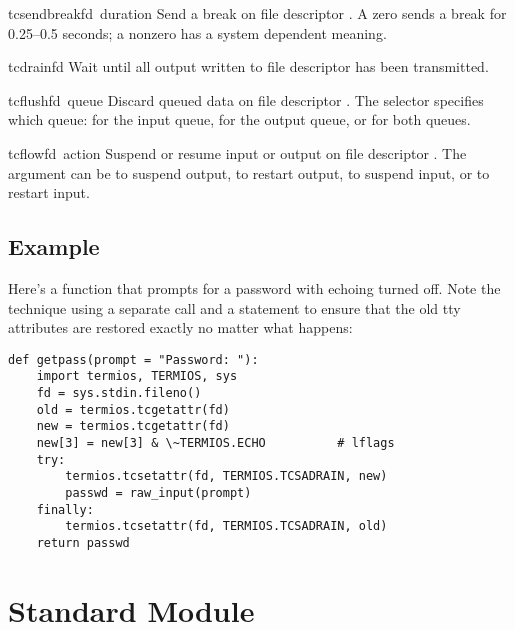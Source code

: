 \begin{funcdesc}{tcsendbreak}{fd\, duration}
Send a break on file descriptor .  A zero  sends
a break for 0.25--0.5 seconds; a nonzero  has a system
dependent meaning.
\end{funcdesc}

\begin{funcdesc}{tcdrain}{fd}
Wait until all output written to file descriptor  has been
transmitted.
\end{funcdesc}

\begin{funcdesc}{tcflush}{fd\, queue}
Discard queued data on file descriptor .  The 
selector specifies which queue:  for the input
queue,  for the output queue, or
 for both queues.
\end{funcdesc}

\begin{funcdesc}{tcflow}{fd\, action}
Suspend or resume input or output on file descriptor .  The
 argument can be  to suspend output,
 to restart output,  to
suspend input, or  to restart input.
\end{funcdesc}

\subsection{Example}

Here's a function that prompts for a password with echoing turned off.
Note the technique using a separate  call
and a  statement to ensure that the old tty
attributes are restored exactly no matter what happens:

\begin{verbatim}
def getpass(prompt = "Password: "):
    import termios, TERMIOS, sys
    fd = sys.stdin.fileno()
    old = termios.tcgetattr(fd)
    new = termios.tcgetattr(fd)
    new[3] = new[3] & \~TERMIOS.ECHO          # lflags
    try:
        termios.tcsetattr(fd, TERMIOS.TCSADRAIN, new)
        passwd = raw_input(prompt)
    finally:
        termios.tcsetattr(fd, TERMIOS.TCSADRAIN, old)
    return passwd
\end{verbatim}

\section{Standard Module }
\label{module-TERMIOSuppercase}

